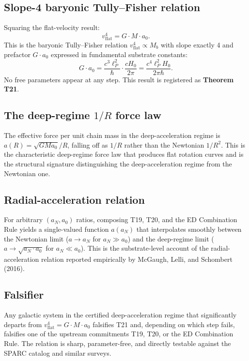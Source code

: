 \documentclass[11pt,a4paper]{article}
\begin{document}
\subsection{Slope-4 baryonic Tully--Fisher relation}

Squaring the flat-velocity result:
\begin{equation}
\boxed{\;v_{\mathrm{flat}}^4 = G \cdot M \cdot a_0.\;}
\end{equation}
This is the baryonic Tully--Fisher relation $v_{\mathrm{flat}}^4 \propto M_b$ with slope exactly 4 and prefactor $G\cdot a_0$ expressed in fundamental substrate constants:
\begin{equation}
G \cdot a_0 = \frac{c^3 \ell_P^2}{\hbar} \cdot \frac{c H_0}{2\pi} = \frac{c^4 \ell_P^2 H_0}{2\pi \hbar}.
\end{equation}
No free parameters appear at any step. This result is registered as \textbf{Theorem T21}.

\subsection{The deep-regime $1/R$ force law}

The effective force per unit chain mass in the deep-acceleration regime is $a(R) = \sqrt{G M a_0}/R$, falling off as $1/R$ rather than the Newtonian $1/R^2$. This is the characteristic deep-regime force law that produces flat rotation curves and is the structural signature distinguishing the deep-acceleration regime from the Newtonian one.

\subsection{Radial-acceleration relation}

For arbitrary $(a_N, a_0)$ ratios, composing T19, T20, and the ED Combination Rule yields a single-valued function $a(a_N)$ that interpolates smoothly between the Newtonian limit ($a \to a_N$ for $a_N \gg a_0$) and the deep-regime limit ($a \to \sqrt{a_N \cdot a_0}$ for $a_N \ll a_0$). This is the substrate-level account of the radial-acceleration relation reported empirically by McGaugh, Lelli, and Schombert (2016).

\subsection{Falsifier}

Any galactic system in the certified deep-acceleration regime that significantly departs from $v_{\mathrm{flat}}^4 = G\cdot M \cdot a_0$ falsifies T21 and, depending on which step fails, falsifies one of the upstream commitments T19, T20, or the ED Combination Rule. The relation is sharp, parameter-free, and directly testable against the SPARC catalog and similar surveys.
\end{document}

